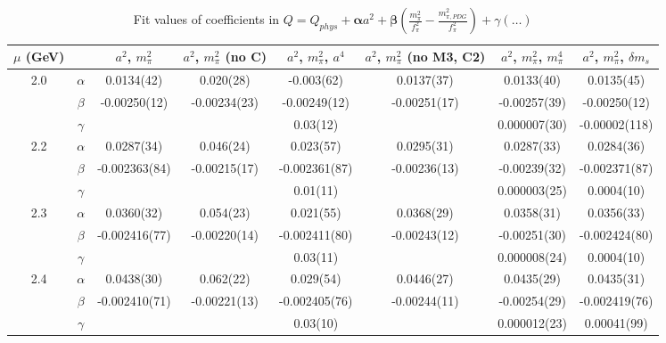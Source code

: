 \documentclass[12pt]{extarticle}
\begin{document}
\begin{table}[h!]
\begin{center}
\begin{tabular}{|c c|c|c|c|c|c|c|}
\hline
$\mu$ (GeV) &  & $a^2$, $m_\pi^2$& $a^2$, $m_\pi^2$ (no C)& $a^2$, $m_\pi^2$, $a^4$& $a^2$, $m_\pi^2$ (no M3, C2)& $a^2$, $m_\pi^2$, $m_\pi^4$& $a^2$, $m_\pi^2$, $\delta m_s$\\
\hline
\multirow{3}{0.5in}{2.0} & $\alpha$ & 0.0134(42)& 0.020(28)& -0.003(62)& 0.0137(37)& 0.0133(40)& 0.0135(45)\\
 & $\beta$ & -0.00250(12)& -0.00234(23)& -0.00249(12)& -0.00251(17)& -0.00257(39)& -0.00250(12)\\
 & $\gamma$ &  &  & 0.03(12)&  & 0.000007(30)& -0.00002(118)\\
\hline
\multirow{3}{0.5in}{2.2} & $\alpha$ & 0.0287(34)& 0.046(24)& 0.023(57)& 0.0295(31)& 0.0287(33)& 0.0284(36)\\
 & $\beta$ & -0.002363(84)& -0.00215(17)& -0.002361(87)& -0.00236(13)& -0.00239(32)& -0.002371(87)\\
 & $\gamma$ &  &  & 0.01(11)&  & 0.000003(25)& 0.0004(10)\\
\hline
\multirow{3}{0.5in}{2.3} & $\alpha$ & 0.0360(32)& 0.054(23)& 0.021(55)& 0.0368(29)& 0.0358(31)& 0.0356(33)\\
 & $\beta$ & -0.002416(77)& -0.00220(14)& -0.002411(80)& -0.00243(12)& -0.00251(30)& -0.002424(80)\\
 & $\gamma$ &  &  & 0.03(11)&  & 0.000008(24)& 0.0004(10)\\
\hline
\multirow{3}{0.5in}{2.4} & $\alpha$ & 0.0438(30)& 0.062(22)& 0.029(54)& 0.0446(27)& 0.0435(29)& 0.0435(31)\\
 & $\beta$ & -0.002410(71)& -0.00221(13)& -0.002405(76)& -0.00244(11)& -0.00254(29)& -0.002419(76)\\
 & $\gamma$ &  &  & 0.03(10)&  & 0.000012(23)& 0.00041(99)\\
\hline
\end{tabular}
\caption{Fit values of coefficients in $Q = Q_{phys} + \mathbf{\alpha} a^2 + \mathbf{\beta}\left(\frac{m_\pi^2}{f_\pi^2}-\frac{m_{\pi,PDG}^2}{f_\pi^2}\right) + \gamma(\ldots)$}
\end{center}
\end{table}





\end{document}
